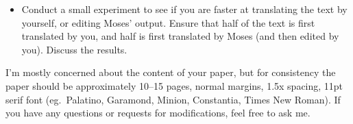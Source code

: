\documentclass[10pt]{article}
\begin{document}
\begin{spacing}{1.35}
\begin{itemize}
\item Conduct a small experiment to see if you are faster at translating the text by yourself, or editing Moses' output.
	Ensure that half of the text is first translated by you, and half is first translated by Moses (and then edited by you).
	Discuss the results.

\end{itemize}

I'm mostly concerned about the content of your paper, but for consistency the paper should be approximately 10--15 pages, normal margins, 1.5x spacing, 11pt serif font (eg.~Palatino, Garamond, Minion, Constantia, Times New Roman).
If you have any questions or requests for modifications, feel free to ask me.


\end{spacing}
%
\end{document}

